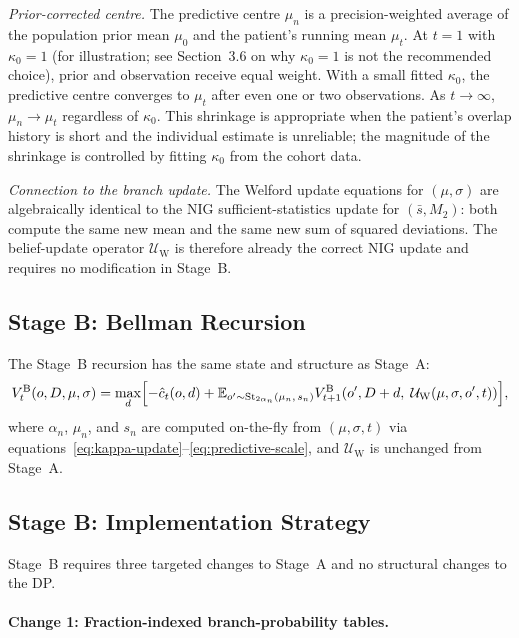 \documentclass[11pt]{article}
\begin{document}
\noindent\textit{Prior-corrected centre.} The predictive centre $\mu_n$ is a precision-weighted average of the population prior mean $\mu_0$ and the patient's running mean $\mu_t$. At $t=1$ with $\kappa_0=1$ (for illustration; see Section~3.6 on why $\kappa_0=1$ is not the recommended choice), prior and observation receive equal weight. With a small fitted $\kappa_0$, the predictive centre converges to $\mu_t$ after even one or two observations. As $t\to\infty$, $\mu_n\to\mu_t$ regardless of $\kappa_0$. This shrinkage is appropriate when the patient's overlap history is short and the individual estimate is unreliable; the magnitude of the shrinkage is controlled by fitting $\kappa_0$ from the cohort data.

\noindent\textit{Connection to the branch update.} The Welford update equations for $(\mu, \sigma)$ are algebraically identical to the NIG sufficient-statistics update for $(\bar s, M_2)$: both compute the same new mean and the same new sum of squared deviations. The belief-update operator $\mathcal U_{\mathrm{W}}$ is therefore already the correct NIG update and requires no modification in Stage~B.

\subsection{Stage B: Bellman Recursion}

The Stage~B recursion has the same state and structure as Stage~A:
\begin{equation}
V_t^{\mathrm{B}}(o,D,\mu,\sigma) =
\max_d \Bigl[
-\hat c_t(o,d)
+ \mathbb{E}_{o' \sim \mathrm{St}_{2\alpha_n}(\mu_n,\, s_n)}
V_{t+1}^{\mathrm{B}}\!\left(o', D+d,\; \mathcal U_{\mathrm{W}}(\mu,\sigma,o',t)\right)
\Bigr],
\end{equation}
where $\alpha_n$, $\mu_n$, and $s_n$ are computed on-the-fly from $(\mu, \sigma, t)$ via equations~\eqref{eq:kappa-update}--\eqref{eq:predictive-scale}, and $\mathcal U_{\mathrm{W}}$ is unchanged from Stage~A.

\subsection{Stage B: Implementation Strategy}

Stage~B requires three targeted changes to Stage~A and no structural changes to the DP.

\paragraph{Change 1: Fraction-indexed branch-probability tables.}
\end{document}
